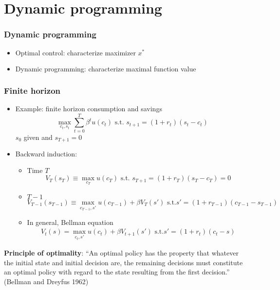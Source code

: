 \documentclass[compress]{beamer}
\begin{document}
\section{Dynamic programming}

\begin{frame}\frametitle{Dynamic programming}
  \begin{itemize}
  \item Optimal control: characterize maximizer $x^\ast$
  \item Dynamic programming: characterize maximal function value
  \end{itemize}
\end{frame}

\begin{frame}\frametitle{Finite horizon}
\begin{itemize}
\item Example: finite horizon consumption and savings
  \[ \max_{c_t,s_t} \sum_{t=0}^T \beta^t u(c_t) \text{ s.t. }
  s_{t+1} = (1+r_t) (s_t - c_t) \]
  $s_0$ given and $s_{T+1} = 0$
\item Backward induction:
  \begin{itemize}
  \item Time $T$
    \[ V_T(s_T) \equiv \max_{c_T} u(c_T) \text{ s.t. } s_{T+1} = (1+r_T)(s_T
    -c_T) = 0 \] 
  \item $T-1$
    \[ V_{T-1}(s_{T-1}) \equiv \max_{c_{T-1},s'} u(c_{T-1}) + \beta V_T(s') \text{ s.t.} s' =
    (1+r_{T-1})(c_{T-1}-s_{T-1}) \]
  \item In general, Bellman equation
    \begin{align} 
      V_t(s) = \max_{c_t,s'} u(c_{t}) + \beta V_{t+1}(s') \text{ s.t.} s' =
      (1+r_{t})(c_{t}-s)
    \end{align}
  \end{itemize}
\end{itemize}
\end{frame}

\begin{frame}
  \textbf{Principle of optimality}: 
  ``An optimal policy has the property that whatever the initial state
  and initial decision are, the remaining decisions must constitute an
  optimal policy with regard to the state resulting from the first
  decision.''  (Bellman and Dreyfus 1962) 
\end{frame}
\end{document}
